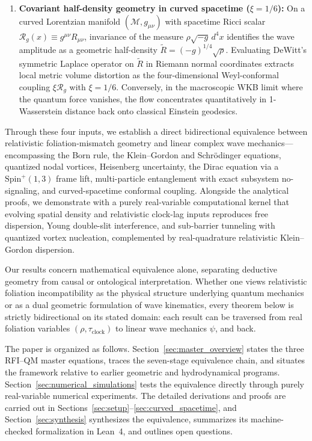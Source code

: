 \documentclass[11pt, a4paper]{article}
\theoremstyle{definition}
\begin{document}
\begin{enumerate}[label=(\Roman*)]
    \item \textbf{Covariant half-density geometry in curved spacetime ($\xi = 1/6$):} On a curved Lorentzian manifold $(\mathcal{M}, g_{\mu\nu})$ with spacetime Ricci scalar $\mathcal{R}_g(x) \equiv g^{\mu\nu}R_{\mu\nu}$, invariance of the measure $\rho\sqrt{-g}\,d^4x$ identifies the wave amplitude as a geometric half-density $\tilde{R} = (-g)^{1/4}\sqrt{\rho}$. Evaluating DeWitt's symmetric Laplace operator on $\tilde{R}$ in Riemann normal coordinates extracts local metric volume distortion as the four-dimensional Weyl-conformal coupling $\xi\mathcal{R}_g$ with $\xi = 1/6$. Conversely, in the macroscopic WKB limit where the quantum force vanishes, the flow concentrates quantitatively in 1-Wasserstein distance back onto classical Einstein geodesics.
\end{enumerate}

Through these four inputs, we establish a direct bidirectional equivalence between relativistic foliation-mismatch geometry and linear complex wave mechanics---encompassing the Born rule, the Klein--Gordon and Schr\"{o}dinger equations, quantized nodal vortices, Heisenberg uncertainty, the Dirac equation via a $\mathrm{Spin}^+(1,3)$ frame lift, multi-particle entanglement with exact subsystem no-signaling, and curved-spacetime conformal coupling. Alongside the analytical proofs, we demonstrate with a purely real-variable computational kernel that evolving spatial density and relativistic clock-lag inputs reproduces free dispersion, Young double-slit interference, and sub-barrier tunneling with quantized vortex nucleation, complemented by real-quadrature relativistic Klein--Gordon dispersion.

Our results concern mathematical equivalence alone, separating deductive geometry from causal or ontological interpretation. Whether one views relativistic foliation incompatibility as the physical structure underlying quantum mechanics or as a dual geometric formulation of wave kinematics, every theorem below is strictly bidirectional on its stated domain: each result can be traversed from real foliation variables $(\rho, \tau_{\text{clock}})$ to linear wave mechanics $\psi$, and back.

The paper is organized as follows. Section~\ref{sec:master_overview} states the three RFI--QM master equations, traces the seven-stage equivalence chain, and situates the framework relative to earlier geometric and hydrodynamical programs. Section~\ref{sec:numerical_simulations} tests the equivalence directly through purely real-variable numerical experiments. The detailed derivations and proofs are carried out in Sections~\ref{sec:setup}--\ref{sec:curved_spacetime}, and Section~\ref{sec:synthesis} synthesizes the equivalence, summarizes its machine-checked formalization in Lean~4, and outlines open questions.
\end{document}
